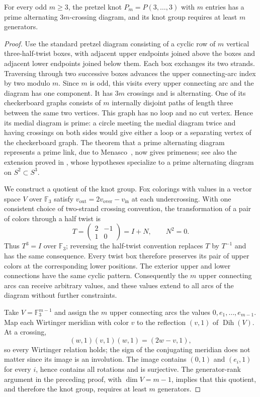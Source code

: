 \begin{proposition}
\label{prop:su2-prime-rank-obstruction}
For every odd $m\geq3$, the pretzel knot
$P_m=P(3,\ldots,3)$ with $m$ entries has a prime alternating
$3m$-crossing diagram, and its knot group requires at least $m$
generators.
\end{proposition}

\begin{proof}
Use the standard pretzel diagram consisting of a cyclic row of $m$
vertical three-half-twist boxes, with adjacent upper endpoints joined
above the boxes and adjacent lower endpoints joined below them.  Each
box exchanges its two strands.  Traversing through two successive boxes
advances the upper connecting-arc index by two modulo $m$.  Since $m$
is odd, this visits every upper connecting arc and the diagram has one
component.  It has $3m$ crossings and is alternating.  One of its
checkerboard graphs consists of $m$ internally disjoint paths of length
three between the same two vertices.  This graph has no loop and no cut
vertex.  Hence its medial diagram is prime: a circle meeting the medial
diagram twice and having crossings on both sides would give either a
loop or a separating vertex of the checkerboard graph.  The theorem
that a prime alternating diagram represents a prime link, due to
Menasco~\cite{Menasco1984}, now gives primeness; see also the extension proved in
\cite[Theorem~10.3]{PurcellTsvietkova2023}, whose hypotheses specialize
to a prime alternating diagram on $S^2\subset S^3$.

We construct a quotient of the knot group.  Fox colorings with values
in a vector space $V$ over $\mathbb F_3$ satisfy
$v_{\mathrm{out}}=2v_{\mathrm{over}}-v_{\mathrm{in}}$ at each
undercrossing.  With one consistent choice of two-strand crossing
convention, the transformation of a pair of colors through a half twist
is
\[
 T=\begin{pmatrix}2&-1\\1&0\end{pmatrix}=I+N,
 \qquad N^2=0.
\]
Thus $T^3=I$ over $\mathbb F_3$; reversing the half-twist convention
replaces $T$ by $T^{-1}$ and has the same consequence.  Every twist
box therefore preserves its pair of upper colors at the corresponding
lower positions.  The exterior upper and lower connections have the
same cyclic pattern.  Consequently the $m$ upper connecting arcs can
receive arbitrary values, and these values extend to all arcs of the
diagram without further constraints.

Take $V=\mathbb F_3^{m-1}$ and assign the $m$ upper connecting arcs
the values $0,e_1,\ldots,e_{m-1}$.  Map each Wirtinger meridian
with color $v$ to the reflection $(v,1)$ of
$\operatorname{Dih}(V)$.  At a crossing,
\[
 (w,1)(v,1)(w,1)=(2w-v,1),
\]
so every Wirtinger relation holds; the sign of the conjugating meridian
does not matter since its image is an involution.  The image contains
$(0,1)$ and $(e_i,1)$ for every $i$, hence contains all rotations and
is surjective.  The generator-rank argument in the preceding proof,
with $\dim V=m-1$, implies that this quotient, and therefore the knot
group, requires at least $m$ generators.
\end{proof}

